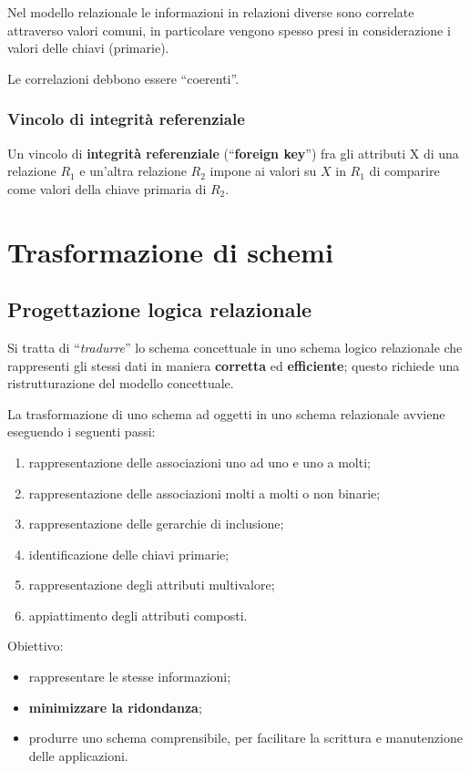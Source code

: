 Nel modello relazionale le informazioni in relazioni diverse sono correlate attraverso valori comuni, in particolare vengono spesso presi in considerazione i valori delle chiavi (primarie).\

Le correlazioni debbono essere ``coerenti''.

\subsubsection{Vincolo di integrità referenziale}

Un vincolo di \textbf{integrità referenziale} (``\textbf{foreign key}'') fra gli attributi X di una relazione $R_1$ e un'altra relazione $R_2$ impone ai valori su $X$ in $R_1$ di comparire come valori della chiave primaria di $R_2$.

\section{Trasformazione di schemi}

\subsection{Progettazione logica relazionale}

Si tratta di ``\textit{tradurre}'' lo schema concettuale in uno schema logico relazionale che rappresenti gli stessi dati in maniera \textbf{corretta} ed \textbf{efficiente}; questo richiede una ristrutturazione del modello concettuale.

La trasformazione di uno schema ad oggetti in uno schema relazionale avviene eseguendo i seguenti passi:

\begin{enumerate}
	\item rappresentazione delle associazioni uno ad uno e uno a molti;
	\item rappresentazione delle associazioni molti a molti o non binarie;
	\item rappresentazione delle gerarchie di inclusione;
	\item identificazione delle chiavi primarie;
	\item rappresentazione degli attributi multivalore;
	\item appiattimento degli attributi composti.
\end{enumerate}
Obiettivo:
\begin{itemize}
	\item rappresentare le stesse informazioni;
	\item \textbf{minimizzare la ridondanza};
	\item produrre uno schema comprensibile, per facilitare la scrittura e manutenzione delle applicazioni.
\end{itemize}

